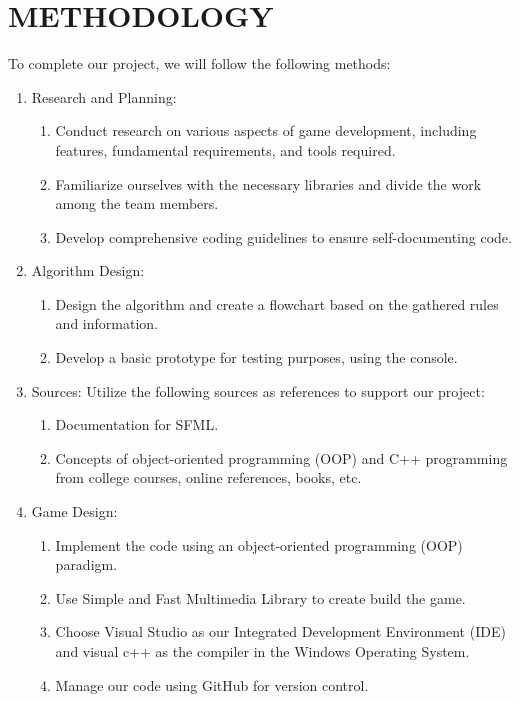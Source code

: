 	\newpage
\section{METHODOLOGY}
To complete our project, we will follow the following methods:

\begin{enumerate}
	\item Research and Planning:
		\begin{enumerate}
			\item  Conduct research on various aspects of game development, including features, fundamental requirements, and tools required.
			\item Familiarize ourselves with the necessary libraries and divide the work among the team members.
			\item Develop comprehensive coding guidelines to ensure self-documenting code.
			
		\end{enumerate}
	\item Algorithm Design: 
		\begin{enumerate}
			
			\item Design the algorithm and create a flowchart based on the gathered rules and information. 
			\item Develop a basic prototype for testing purposes, using the console.

			
		\end{enumerate}
	
	\item  Sources:
		Utilize the following sources as references to support our project:
		\begin{enumerate}
			
			\item Documentation for SFML.
			\item Concepts of object-oriented programming (OOP) and C++ programming from college courses, online references, books, etc.
			
			
		\end{enumerate}
		
	\item Game Design:
	
		\begin{enumerate}
			
			\item Implement the code using an object-oriented programming (OOP) paradigm. 
			\item Use Simple and Fast Multimedia Library to create build the game.
			\item Choose Visual Studio as our Integrated Development Environment (IDE) and visual c++ as the compiler in the Windows Operating System.
			\item Manage our code using GitHub for version control.
			

\end{enumerate}
\end{enumerate}
